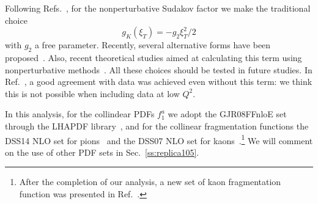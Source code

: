\documentclass[aps,preprintnumbers,showpacs,nofootinbib,superscriptaddress,floatfix]{revtex4}
\newcommand{\bT}{\xi_T}
\begin{document}


Following Refs.~\cite{Nadolsky:1999kb,Landry:2002ix,Konychev:2005iy}, for the
nonperturbative Sudakov factor we make the traditional choice 
\begin{equation}
g_K (\bT) = - g_2 \bT^2 / 2
\end{equation} 
with $g_2$ a free parameter. Recently, several alternative
forms have been proposed~\cite{Aidala:2014hva,Collins:2014jpa}. Also, recent
theoretical studies aimed at calculating this term using nonperturbative
methods~\cite{Scimemi:2016ffw}.  
All these
choices should be tested in future studies. In Ref.~\cite{D'Alesio:2014vja}, a
good agreement with data was achieved even without this term: we think this is
not possible when including data at low $Q^2$.

In this analysis, for the collindear PDFs $f_1^a$ we adopt the GJR08FFnloE
set~\cite{Gluck:2007ck} through the LHAPDF library~\cite{Buckley:2014ana}, and
for the collinear fragmentation functions 
the DSS14 NLO set for
pions~\cite{deFlorian:2014xna} and the DSS07 NLO set for
kaons~\cite{deFlorian:2007aj}.\footnote{After the completion of our analysis, 
a new set of kaon
  fragmentation function was presented in Ref.~\cite{deFlorian:2017lwf}.} We
will comment on the use of other PDF sets in Sec.~\ref{ss:replica105}.
\end{document}
